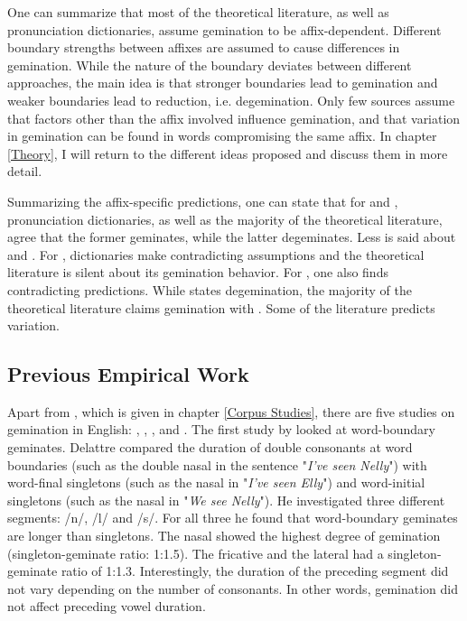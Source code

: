  
One can summarize that most of the theoretical literature, as well as pronunciation dictionaries, assume gemination to be affix-dependent. Different boundary strengths between affixes are assumed to cause differences in gemination. While the nature of the boundary deviates between different approaches, the main idea is that stronger boundaries lead to gemination and weaker boundaries lead to reduction, i.e. degemination. Only few sources assume that factors other than the affix involved influence gemination, and that variation in gemination can be found in words compromising the same affix.  In chapter \ref{Theory}, I will return to the different ideas proposed and discuss them in more detail. 

Summarizing the affix-specific predictions, one can state that for  and , pronunciation dictionaries, as well as the majority of the theoretical literature, agree that the former geminates, while the latter degeminates. Less is said about  and . For , dictionaries make contradicting assumptions and the theoretical literature is silent about its gemination behavior. For , one also finds contradicting predictions. While \cite{Wells.2008} states degemination, the majority of the theoretical literature claims gemination with . Some of the literature predicts variation. 

\subsection{Previous Empirical Work}\label{previous empirical work}

Apart from \cite{BenHedia.2017}, which is given in chapter \ref{Corpus Studies}, there are five studies on gemination in English: \cite{Delattre.}, \cite{ Kaye.2005}, \cite{Oh.2012}, \cite{Oh.2013}   and \cite{Kotzor.2016}.   %
The first study by \cite{Delattre.} looked at word-boundary geminates. Delattre compared the duration of double consonants at word boundaries (such as the double nasal  in the sentence "\textit{I've seen Nelly}") with word-final singletons (such as the nasal in "\textit{I've seen Elly}") and word-initial singletons (such as the nasal in "\textit{We see Nelly}"). He investigated three different segments: /n/, /l/ and /s/. For all three he found that word-boundary geminates are longer than singletons. The nasal showed the highest degree of gemination (singleton-geminate ratio: 1:1.5). The fricative and the lateral had a singleton-geminate ratio of 1:1.3. Interestingly, the duration of the preceding segment did not vary depending on the number of consonants. In other words, gemination did not affect preceding vowel duration.


